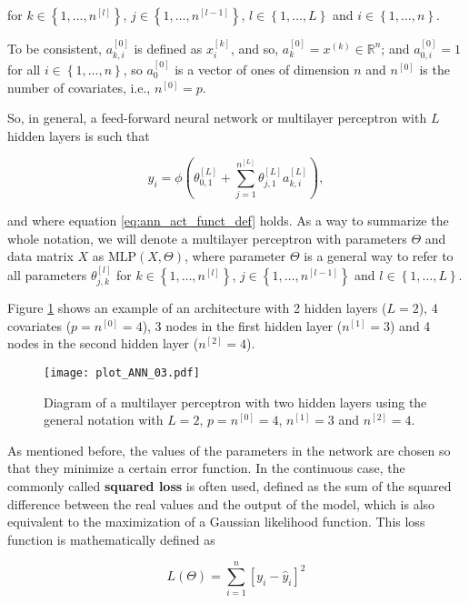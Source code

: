 for $k \in \left\{ 1, \ldots, n^{[l]} \right\}$, $j \in \left\{ 1, \ldots, n^{[l-1]} \right\}$, $l \in \left\{ 1, \ldots, L \right\}$ and $i \in \left\{ 1, \ldots, n \right\}$.

To be consistent, $a_{k,i}^{[0]}$ is defined as $x_i^{[k]}$, and so, $a_{k}^{[0]} = x^{(k)} \in \mathbb{R}^n$; and $a_{0,i}^{[0]} = 1$ for all $i \in \left\{ 1, \ldots, n \right\}$, so $a_{0}^{[0]}$ is a vector of ones of dimension $n$ and $n^{[0]}$ is the number of covariates, i.e., $n^{[0]} = p$.

So, in general, a feed-forward neural network or multilayer perceptron with $L$ hidden layers is such that

$$
  y_i = \phi \left( \theta_{0,1}^{[L]} +  \sum_{j = 1}^{n^{[L]}} \theta_{j,1}^{[L]} a_{k,i}^{[L]} \right),
$$

and where equation \ref{eq:ann_act_funct_def} holds. As a way to summarize the whole notation, we will denote a multilayer perceptron with parameters $\Theta$ and data matrix $X$ as $\mathrm{MLP} \left(X, \Theta \right)$, where parameter $\Theta$ is a general way to refer to all parameters $\theta_{j,k}^{[l]}$ for $k \in \left\{ 1, \ldots, n^{[l]} \right\}$, $j \in \left\{ 1, \ldots, n^{[l-1]} \right\}$ and $l \in \left\{ 1, \ldots, L \right\}$.

Figure \ref{fig:theory_ANN_diagram_03} shows an example of an architecture with 2 hidden layers ($L = 2$), 4 covariates ($p = n^{[0]} = 4$), 3 nodes in the first hidden layer ($n^{[1]} = 3$) and 4 nodes in the second hidden layer ($n^{[2]} = 4$).

\begin{figure}[H]
    \centering
    \texttt{[image: plot\_ANN\_03.pdf]}
    \caption{Diagram of a multilayer perceptron with two hidden layers using the general notation with $L = 2$, $p = n^{[0]} = 4$, $n^{[1]} = 3$ and $n^{[2]} = 4$.}
    \label{fig:theory_ANN_diagram_03}
\end{figure}

As mentioned before, the values of the parameters in the network are chosen so that they minimize a certain error function. In the continuous case, the commonly called \textbf{squared loss} is often used, defined as the sum of the squared difference between the real values and the output of the model, which is also equivalent to the maximization of a Gaussian likelihood function. This loss function is mathematically defined as

\begin{equation*}
  L(\Theta) = \sum_{i = 1}^n \left[ y_i - \hat{y}_i \right]^2
\end{equation*}

